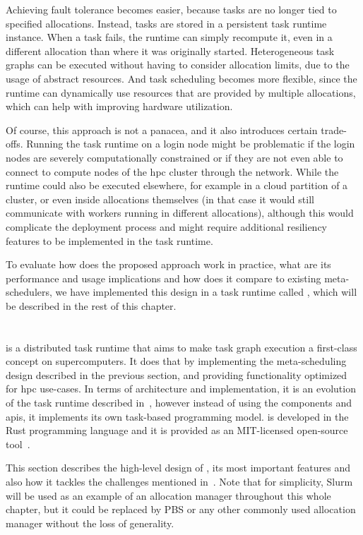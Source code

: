 Achieving fault tolerance becomes easier, because tasks are no longer tied to specified allocations. Instead,
tasks are stored in a persistent task runtime instance. When a task fails, the runtime can simply recompute it, even
in a different allocation than where it was originally started. Heterogeneous task graphs can be executed without having to consider allocation limits, due to the usage
of abstract resources. And task scheduling becomes more flexible, since the runtime can dynamically use resources that are provided by
multiple allocations, which can help with improving hardware utilization.

Of course, this approach is not a panacea, and it also introduces certain trade-offs. Running the task runtime on a
login node might be problematic if the login nodes are severely computationally constrained or if they are not even
able to connect to compute nodes of the \gls{hpc} cluster through the network.
While the runtime could also be executed elsewhere, for example in a cloud partition of a cluster, or even inside
allocations themselves (in that case it would still communicate with workers running in different allocations),
although this would complicate the deployment process and might require additional resiliency features to be implemented
in the task runtime.

To evaluate how does the proposed approach work in practice, what are its performance and usage implications and how does
it compare to existing meta-schedulers, we have implemented this design in a task runtime called \hyperqueue{}, which
will be described in the rest of this chapter.

\section{\hyperqueue{}}
\hyperqueue{} is a distributed task runtime that aims to make task graph execution a first-class concept on supercomputers.
It does that by implementing the meta-scheduling design described in the previous section, and providing functionality optimized
for \gls{hpc} use-cases. In terms of architecture and implementation, it is an evolution of the \rsds{} task runtime described
in~, however instead of using the \dask{} components and \glspl{api}, it implements its own task-based
programming model. \hyperqueue{} is developed in the Rust programming language and it is provided as
an \mbox{MIT-licensed} open-source tool~\cite{hq_github}.

This section describes the high-level design of \hyperqueue{}, its most important features
and also how it tackles the challenges mentioned in~. Note that for simplicity, Slurm will be
used as an example of an allocation manager throughout this whole chapter, but it could be replaced
by PBS or any other commonly used allocation manager without the loss of generality.

